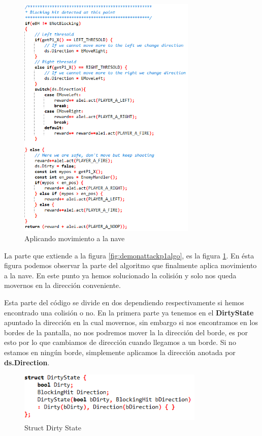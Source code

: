 \begin{figure}[h]
	\centering
	\includegraphics[width=0.76\textwidth]{Figures/damovement}
	\caption{Aplicando movimiento a la nave}
	\label{fig:damovement}
\end{figure}

La parte que extiende a la figura \ref{fig:demonattackp1algo}, es la figura \ref{fig:damovement}. En ésta figura podemos observar la parte del algoritmo que finalmente aplica movimiento a la nave. En este punto ya hemos solucionado la colisión y solo nos queda movernos en la dirección conveniente.

Esta parte del código se divide en dos dependiendo respectivamente si hemos encontrado una colisión o no. En la primera parte ya tenemos en el \textbf{DirtyState} apuntado la dirección en la cual movernos, sin embargo si nos encontramos en los bordes de la pantalla, no nos podremos mover la la dirección del borde, es por esto por lo que cambiamos de dirección cuando llegamos a un borde. Si no estamos en ningún borde, simplemente aplicamos la dirección anotada por \textbf{ds.Direction}.

\begin{figure}[h]
	\centering
	\includegraphics[width=0.79\textwidth]{Figures/structdirtystateda}
	\caption{Struct Dirty State}
	\label{fig:structdirtystateda}
\end{figure}

